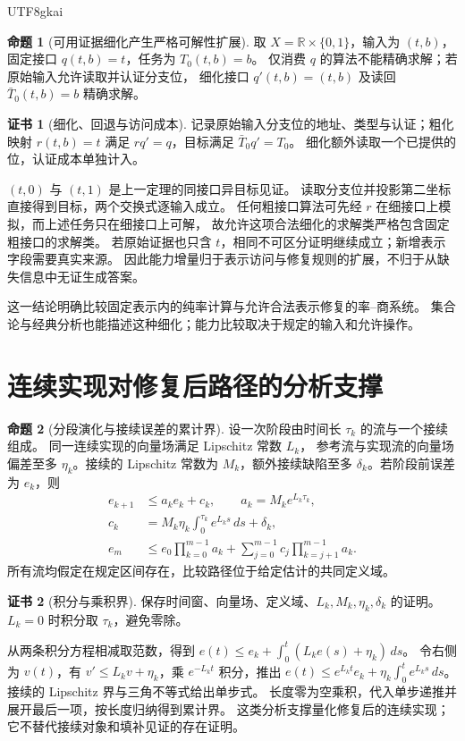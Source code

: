 \documentclass[12pt]{report}
\makeatletter
\theoremstyle{definition}
\newtheorem{proposition}{命题}[chapter]
\newtheorem{Certificate}{证书}[chapter]
\renewenvironment{proof}[1][\proofname]{\par
  \pushQED{\qed}\normalfont
  \topsep6\p@\@plus6\p@\relax
  \trivlist
  \item[\hskip\labelsep\normalfont #1\@addpunct{.}]\ignorespaces
}{
  \popQED\endtrivlist\@endpefalse
}
\newcommand{\RR}{\mathbb R}
\makeatother
\begin{document}
\begin{CJK*}{UTF8}{gkai}
\begin{proposition}[可用证据细化产生严格可解性扩展]
\label{prop:refinement-gain}
取 \(X=\RR\times\{0,1\}\)，输入为 \((t,b)\)，
固定接口 \(q(t,b)=t\)，任务为 \(T_0(t,b)=b\)。
仅消费 \(q\) 的算法不能精确求解；若原始输入允许读取并认证分支位，
细化接口 \(q'(t,b)=(t,b)\) 及读回 \(\bar T_0(t,b)=b\) 精确求解。
\end{proposition}
\begin{Certificate}[细化、回退与访问成本]
记录原始输入分支位的地址、类型与认证；粗化映射
\(r(t,b)=t\) 满足 \(rq'=q\)，目标满足 \(\bar T_0q'=T_0\)。
细化额外读取一个已提供的位，认证成本单独计入。
\end{Certificate}
\begin{proof}
\((t,0)\) 与 \((t,1)\) 是上一定理的同接口异目标见证。
读取分支位并投影第二坐标直接得到目标，两个交换式逐输入成立。
任何粗接口算法可先经 \(r\) 在细接口上模拟，而上述任务只在细接口上可解，
故允许这项合法细化的求解类严格包含固定粗接口的求解类。
若原始证据也只含 \(t\)，相同不可区分证明继续成立；新增表示字段需要真实来源。
因此能力增量归于表示访问与修复规则的扩展，不归于从缺失信息中无证生成答案。
\end{proof}
这一结论明确比较固定表示内的纯率计算与允许合法表示修复的率--商系统。
集合论与经典分析也能描述这种细化；能力比较取决于规定的输入和允许操作。

\section{连续实现对修复后路径的分析支撑}
\begin{proposition}[分段演化与接续误差的累计界]
\label{prop:analytic-support}
设一次阶段由时间长 \(\tau_k\) 的流与一个接续组成。
同一连续实现的向量场满足 Lipschitz 常数 \(L_k\)，
参考流与实现流的向量场偏差至多 \(\eta_k\)。接续的 Lipschitz 常数为
\(M_k\)，额外接续缺陷至多 \(\delta_k\)。若阶段前误差为 \(e_k\)，则
\[
\begin{aligned}
e_{k+1}&\le a_ke_k+c_k,\qquad a_k=M_ke^{L_k\tau_k},\\
c_k&=M_k\eta_k\int_0^{\tau_k}e^{L_ks}\,ds+\delta_k,\\
e_m&\le e_0\prod_{k=0}^{m-1}a_k+
\sum_{j=0}^{m-1}c_j\prod_{k=j+1}^{m-1}a_k.
\end{aligned}
\]
所有流均假定在规定区间存在，比较路径位于给定估计的共同定义域。
\end{proposition}
\begin{Certificate}[积分与乘积界]
保存时间窗、向量场、定义域、\(L_k,M_k,\eta_k,\delta_k\) 的证明。
\(L_k=0\) 时积分取 \(\tau_k\)，避免零除。
\end{Certificate}
\begin{proof}
从两条积分方程相减取范数，得到
\(e(t)\le e_k+\int_0^t(L_ke(s)+\eta_k)\,ds\)。
令右侧为 \(v(t)\)，有 \(v'\le L_kv+\eta_k\)，乘
\(e^{-L_kt}\) 积分，推出
\(e(t)\le e^{L_kt}e_k+\eta_k\int_0^t e^{L_ks}\,ds\)。
接续的 Lipschitz 界与三角不等式给出单步式。
长度零为空乘积，代入单步递推并展开最后一项，按长度归纳得到累计界。
这类分析支撑量化修复后的连续实现；它不替代接续对象和填补见证的存在证明。
\end{proof}


\end{CJK*}
\end{document}
